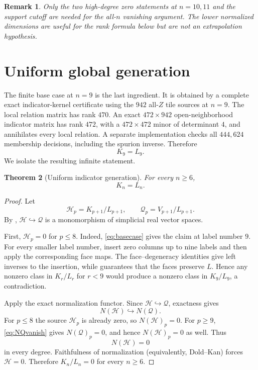 \documentclass[11pt]{article}
\newtheorem{theorem}{Theorem}[section]
\newtheorem{remark}[theorem]{Remark}
\newcommand{\Qcal}{\mathcal Q}
\newcommand{\Hcal}{\mathcal H}
\newcommand{\1}{\mathbf 1}
\begin{document}
\begin{remark}
Only the two high-degree zero statements at $n=10,11$ and the support
cutoff are needed for the all-$n$ vanishing argument.  The lower normalized
dimensions are useful for the rank formula below but are not an
extrapolation hypothesis.
\end{remark}

\section{Uniform global generation}
\label{sec:global}

The finite base case at $n=9$ is the last ingredient.  It is obtained by a
complete exact indicator-kernel certificate using the $942$ all-$Z$ tile
sources at $n=9$.  The local relation matrix has rank $470$.  An exact
$472\times942$ open-neighborhood indicator matrix has rank $472$, with a
$472\times472$ minor of determinant $4$, and annihilates every local
relation.  A separate implementation checks all $444{,}624$ membership
decisions, including the spurion inverse.  Therefore
\begin{equation}\label{eq:basecase}
K_9=L_9.
\end{equation}
We isolate the resulting infinite statement.

\begin{theorem}[Uniform indicator generation]\label{thm:KL}
For every $n\ge6$,
\[
K_n=L_n.
\]
\end{theorem}

\begin{proof}
Let
\[
\Hcal_p=K_{p+1}/L_{p+1},\qquad
\Qcal_p=V_{p+1}/L_{p+1}.
\]
By , $\Hcal\hookrightarrow\Qcal$ is a monomorphism of
simplicial real vector spaces.

First, $\Hcal_p=0$ for $p\le8$.  Indeed, \eqref{eq:basecase} gives the
claim at label number $9$.  For every smaller label number, insert zero
columns up to nine labels and then apply the corresponding face maps.  The
face--degeneracy identities give left inverses to the insertion, while
 guarantees that the faces preserve $L$.  Hence any
nonzero class in $K_r/L_r$ for $r<9$ would produce a nonzero class in
$K_9/L_9$, a contradiction.

Apply the exact normalization functor.  Since
$\Hcal\hookrightarrow\Qcal$, exactness gives
\[
N(\Hcal)\hookrightarrow N(\Qcal).
\]
For $p\le8$ the source $\Hcal_p$ is already zero, so
$N(\Hcal)_p=0$.  For $p\ge9$, \eqref{eq:NQvanish} gives
$N(\Qcal)_p=0$, and hence $N(\Hcal)_p=0$ as well.  Thus
\[
N(\Hcal)=0
\]
in every degree.  Faithfulness of normalization (equivalently, Dold--Kan)
forces $\Hcal=0$.  Therefore $K_n/L_n=0$ for every $n\ge6$.
\end{proof}
\end{document}
